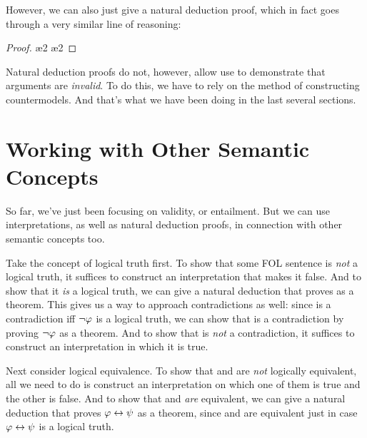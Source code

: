 However, we can also just give a natural deduction proof, which in fact goes through a very similar line of reasoning:
\begin{proof}
	 
	\open
		 
		\ae{2}
		 
		\ae{2}
		 
		 
	\close
	 
\end{proof}

Natural deduction proofs do not, however, allow use to demonstrate that arguments are \emph{invalid}.  To do this, we have to rely on the method of constructing countermodels.  And that's what we have been doing in the last several sections.


\section{Working with Other Semantic Concepts}


So far, we've just been focusing on validity, or entailment. But we can use interpretations, as well as natural deduction proofs, in connection with other semantic concepts too.

Take the concept of logical truth first.  To show that some FOL sentence \meta{\varphi} is \emph{not} a logical truth, it suffices to construct an interpretation that makes it false.  And to show that it \emph{is} a logical truth, we can give a natural deduction that proves \meta{\varphi} as a theorem.  This gives us a way to approach contradictions as well: since \meta{\varphi} is a contradiction iff $\neg\mathcal{\varphi}$ is a logical truth, we can show that \meta{\varphi} is a contradiction by proving $\neg\mathcal{\varphi}$ as a theorem.  And to show that \meta{\varphi} is \emph{not} a contradiction, it suffices to construct an interpretation in which it is true.


Next consider logical equivalence.  To show that \meta{\varphi} and \meta{\psi} are \emph{not} logically equivalent, all we need to do is construct an interpretation on which one of them is true and the other is false.  And to show that \meta{\varphi} and \meta{\psi} \emph{are} equivalent, we can give a natural deduction that proves $\mathcal{\varphi} \leftrightarrow \mathcal{\psi}$ as a theorem, since \meta{\varphi} and \meta{\psi} are equivalent just in case $\mathcal{\varphi} \leftrightarrow \mathcal{\psi}$ is a logical truth.


